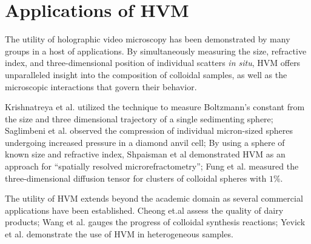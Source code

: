 \section{Applications of HVM}

The utility of holographic video microscopy has been demonstrated by many groups
in a host of applications. By simultaneously measuring the size, refractive index,
and three-dimensional position of individual scatters {\it in situ}, HVM
offers unparalleled insight into the composition of colloidal samples, as well
as the microscopic interactions that govern their behavior.

Krishnatreya et al. utilized the technique to measure Boltzmann's constant from the
size and three dimensional trajectory of a single sedimenting sphere;
Saglimbeni et al. observed the compression of individual micron-sized spheres
undergoing increased pressure in a diamond anvil cell; By using a sphere
of known size and refractive index, Shpaisman et al demonstrated HVM as an
approach for ``spatially resolved microrefractometry''; Fung et al. measured
the three-dimensional diffusion tensor for clusters of colloidal spheres
with $\num{1}$\%.

The utility of HVM extends beyond the academic domain as several commercial
applications have been established. Cheong et.al assess the quality of dairy
products; Wang et al. gauges the progress of colloidal synthesis reactions;
Yevick et al. demonstrate the use of HVM in heterogeneous samples.
